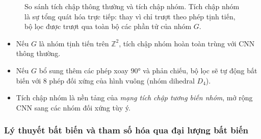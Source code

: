 \begin{figure}[H]
\centering
{}
\caption{So sánh tích chập thông thường và tích chập nhóm. Tích chập nhóm là sự tổng quát hóa trực tiếp: thay vì chỉ trượt theo phép tịnh tiến, bộ lọc được trượt qua toàn bộ các phần tử của nhóm $G$.}
\label{fig:group-conv-compare}
\end{figure}

\begin{itemize}
    \item Nếu $G$ là nhóm tịnh tiến trên $\mathbb{Z}^2$, tích chập nhóm hoàn toàn trùng với CNN thông thường.
    \item Nếu $G$ bổ sung thêm các phép xoay $90°$ và phản chiếu, bộ lọc sẽ tự động bất biến với 8 phép đối xứng của hình vuông (nhóm dihedral $D_4$).
    \item Tích chập nhóm là nền tảng của \textit{mạng tích chập tương biến nhóm}, mở rộng CNN sang các nhóm đối xứng tùy ý.
\end{itemize}

\subsubsection{Lý thuyết bất biến và tham số hóa qua đại lượng bất biến}
\label{subsubsec:invariant-theory}


